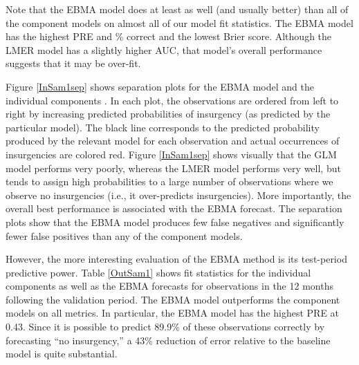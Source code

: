 \documentclass[12pt,fullpage,endnotes]{article}
\begin{document}
Note that the EBMA model does at least as well (and usually better)
than all of the component models on almost all of our model fit statistics.
The EBMA model has the highest PRE and \% correct and the lowest Brier
score.  Although the LMER model has a slightly higher AUC, that
model's overall performance suggests that it may be over-fit.


Figure \ref{InSam1sep} shows separation plots for the EBMA model and
the individual components \citep{Greenhill:2011}. In each plot, the
observations are ordered from left to right by increasing predicted
probabilities of insurgency (as predicted by the particular
model). The black line corresponds to the predicted probability
produced by the relevant model for each observation and actual
occurrences of insurgencies are colored red.  Figure \ref{InSam1sep}
shows visually that the GLM model performs very poorly, whereas the
LMER model performs very well, but tends to assign high probabilities
to a large number of observations where we observe no insurgencies
(i.e., it over-predicts insurgencies).  More importantly, the overall
best performance is associated with the EBMA forecast. The separation
plots show that the EBMA model produces few false negatives and
significantly fewer false positives than any of the component models.


However, the more interesting evaluation of the EBMA method is its
test-period predictive power. Table \ref{OutSam1} shows fit statistics
for the individual components as well as the EBMA forecasts for
observations in the 12 months following the validation period.  The
EBMA model outperforms the component models on all metrics.  In
particular, the EBMA model has the highest PRE at 0.43.  Since it is
possible to predict 89.9\% of these observations correctly by
forecasting ``no insurgency,'' a 43\% reduction of error relative to
the baseline model is quite substantial.
\end{document}
